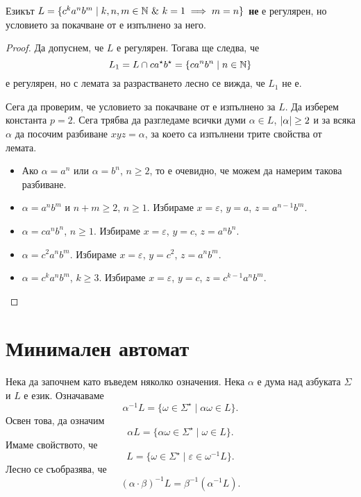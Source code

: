 \begin{example}
  Езикът $L = \{c^ka^nb^m\mid k,n,m \in \Nat\ \&\ k = 1\implies m = n\}$
  {\bf не} е регулярен, но условието за покачване от  е изпълнено за него.
\end{example}
\begin{proof}
  Да допуснем, че $L$ е регулярен.
  Тогава ще следва, че 
  \[L_1 = L\cap ca^\star b^\star = \{ca^nb^n \mid n\in\mathbb{N}\}\]
  е регулярен,
  но с лемата за разрастването лесно се вижда, че $L_1$ не е.

  Сега да проверим, че условието за покачване от  е изпълнено за $L$.
  Да изберем константа $p = 2$.
  Сега трябва да разгледаме всички думи $\alpha \in L$, $\lvert{\alpha}\rvert \geq 2$
  и за всяка $\alpha$ да посочим разбиване $xyz = \alpha$, за което са изпълнени трите свойства от лемата.

  \begin{itemize}
  \item
    Ако $\alpha = a^n$ или $\alpha = b^n$, $n\geq 2$, то е  очевидно, че можем да
    намерим такова разбиване.
  \item
    $\alpha = a^nb^m$ и $n+m \geq 2$, $n \geq 1$.
    Избираме $x = \varepsilon$, $y = a$, $z = a^{n-1}b^m$.
  \item
    $\alpha = ca^nb^n$, $n\geq 1$.
    Избираме $x = \varepsilon$, $y = c$, $z = a^nb^n$.
  \item
    $\alpha = c^2a^nb^m$. 
    Избираме $x = \varepsilon$, $y = c^2$, $z = a^nb^m$.
  \item
    $\alpha = c^ka^nb^m$, $k \geq 3$.
    Избираме $x = \varepsilon$, $y = c$, $z = c^{k-1}a^nb^m$.
  \end{itemize}
\end{proof}

\section{Минимален автомат}

Нека да започнем като въведем няколко означения.
Нека $\alpha$ е дума над азбуката $\Sigma$  и $L$ е език. Означаваме 
\[\alpha^{-1}L = \{\omega \in \Sigma^\star \mid \alpha\omega \in L\}.\]
Освен това, да означим 
\[\alpha L = \{\alpha\omega \in \Sigma^\star \mid \omega \in L\}.\]
Имаме свойството, че
\[L = \{\omega \in \Sigma^\star \mid \varepsilon \in \omega^{-1}L\}.\]
Лесно се съобразява, че 
\[(\alpha\cdot\beta)^{-1}L = \beta^{-1}(\alpha^{-1}L).\]

